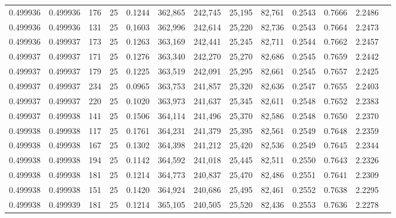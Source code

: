 \begin{tabular}{rrrrrrrrrrrrr}
0.499936 & 0.499936 &   176 &  25 &                                     0.1244 & 362,865 & 242,745 &  25,195 &  82,761 & 0.2543 & 0.7666 & 2.2486 \\
0.499936 & 0.499936 &   131 &  25 &                                     0.1603 & 362,996 & 242,614 &  25,220 &  82,736 & 0.2543 & 0.7664 & 2.2473 \\
0.499936 & 0.499937 &   173 &  25 &                                     0.1263 & 363,169 & 242,441 &  25,245 &  82,711 & 0.2544 & 0.7662 & 2.2457 \\
0.499937 & 0.499937 &   171 &  25 &                                     0.1276 & 363,340 & 242,270 &  25,270 &  82,686 & 0.2545 & 0.7659 & 2.2442 \\
0.499937 & 0.499937 &   179 &  25 &                                     0.1225 & 363,519 & 242,091 &  25,295 &  82,661 & 0.2545 & 0.7657 & 2.2425 \\
0.499937 & 0.499937 &   234 &  25 &                                     0.0965 & 363,753 & 241,857 &  25,320 &  82,636 & 0.2547 & 0.7655 & 2.2403 \\
0.499937 & 0.499937 &   220 &  25 &                                     0.1020 & 363,973 & 241,637 &  25,345 &  82,611 & 0.2548 & 0.7652 & 2.2383 \\
0.499937 & 0.499938 &   141 &  25 &                                     0.1506 & 364,114 & 241,496 &  25,370 &  82,586 & 0.2548 & 0.7650 & 2.2370 \\
0.499938 & 0.499938 &   117 &  25 &                                     0.1761 & 364,231 & 241,379 &  25,395 &  82,561 & 0.2549 & 0.7648 & 2.2359 \\
0.499938 & 0.499938 &   167 &  25 &                                     0.1302 & 364,398 & 241,212 &  25,420 &  82,536 & 0.2549 & 0.7645 & 2.2344 \\
0.499938 & 0.499938 &   194 &  25 &                                     0.1142 & 364,592 & 241,018 &  25,445 &  82,511 & 0.2550 & 0.7643 & 2.2326 \\
0.499938 & 0.499938 &   181 &  25 &                                     0.1214 & 364,773 & 240,837 &  25,470 &  82,486 & 0.2551 & 0.7641 & 2.2309 \\
0.499938 & 0.499938 &   151 &  25 &                                     0.1420 & 364,924 & 240,686 &  25,495 &  82,461 & 0.2552 & 0.7638 & 2.2295 \\
0.499938 & 0.499939 &   181 &  25 &                                     0.1214 & 365,105 & 240,505 &  25,520 &  82,436 & 0.2553 & 0.7636 & 2.2278 \\

\end{tabular}
